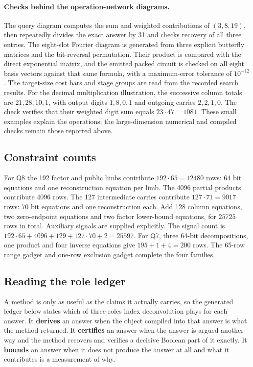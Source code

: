 \documentclass[11pt,a4paper]{article}
\begin{document}
\paragraph{Checks behind the operation-network diagrams.}
The query diagram computes the sum and weighted contributions of $(3,8,19)$,
then repeatedly divides the exact answer by 31 and checks recovery of all
three entries. The eight-slot Fourier diagram is generated from three
explicit butterfly matrices and the bit-reversal permutation. Their product
is compared with the direct exponential matrix, and the emitted packed
circuit is checked on all eight basis vectors against that same formula,
with a maximum-error tolerance of $10^{-12}$. The target-size cost bars
and stage groups are read from the recorded search results.
For the decimal multiplication illustration, the successive column totals
are $21,28,10,1$, with output digits $1,8,0,1$ and outgoing carries
$2,2,1,0$. The check verifies that their weighted digit sum equals
$23\cdot47=1081$. These small examples explain the operations; the
large-dimension numerical and compiled checks remain those reported above.

\subsection{Constraint counts}
For Q8 the 192 factor and public limbs contribute $192\cdot65=12480$
rows: 64 bit equations and one reconstruction equation per limb. The
4096 partial products contribute 4096 rows. The 127 intermediate carries
contribute $127\cdot71=9017$ rows: 70 bit equations and one reconstruction
each. Add 128 column equations, two zero-endpoint equations and two
factor lower-bound equations, for $25725$ rows in total. Auxiliary signals
are supplied explicitly. The signal count is
$192\cdot65+4096+129+127\cdot70+2=25597$.
For Q7, three 64-bit decompositions, one product and four inverse equations
give $195+1+4=200$ rows. The 65-row range gadget and one-row exclusion
gadget complete the four families.

\subsection{Reading the role ledger}
A method is only as useful as the claims it actually carries, so the generated
ledger below states which of three roles index deconvolution plays for each
answer. It \textbf{derives} an answer when the object compiled into that answer
is what the method returned. It \textbf{certifies} an answer when the answer is
argued another way and the method recovers and verifies a decisive Boolean part
of it exactly. It \textbf{bounds} an answer when it does not produce the answer
at all and what it contributes is a measurement of why.
\end{document}
